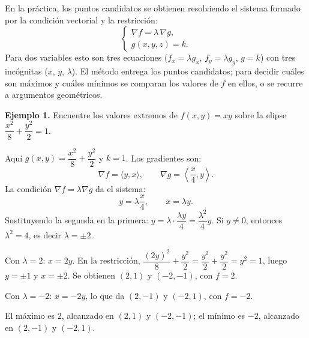 En la práctica, los puntos candidatos se obtienen resolviendo el sistema formado por la condición vectorial y la restricción:
\[
\begin{cases}
\nabla f = \lambda\, \nabla g, \\[2pt]
g(x, y, z) = k.
\end{cases}
\]
Para dos variables esto son tres ecuaciones ($f_x = \lambda g_x$, $f_y = \lambda g_y$, $g = k$) con tres incógnitas ($x$, $y$, $\lambda$). El método entrega los puntos candidatos; para decidir cuáles son máximos y cuáles mínimos se comparan los valores de $f$ en ellos, o se recurre a argumentos geométricos.

\textbf{Ejemplo 1.} Encuentre los valores extremos de $f(x, y) = xy$ sobre la elipse $\dfrac{x^2}{8} + \dfrac{y^2}{2} = 1$.

Aquí $g(x, y) = \dfrac{x^2}{8} + \dfrac{y^2}{2}$ y $k = 1$. Los gradientes son:
\[
\nabla f = \langle y, x \rangle, \qquad \nabla g = \left\langle \frac{x}{4}, y \right\rangle.
\]
La condición $\nabla f = \lambda \nabla g$ da el sistema:
\[
y = \lambda \frac{x}{4}, \qquad x = \lambda y.
\]
Sustituyendo la segunda en la primera: $y = \lambda \cdot \dfrac{\lambda y}{4} = \dfrac{\lambda^2}{4} y$. Si $y \neq 0$, entonces $\lambda^2 = 4$, es decir $\lambda = \pm 2$.

Con $\lambda = 2$: $x = 2y$. En la restricción, $\dfrac{(2y)^2}{8} + \dfrac{y^2}{2} = \dfrac{y^2}{2} + \dfrac{y^2}{2} = y^2 = 1$, luego $y = \pm 1$ y $x = \pm 2$. Se obtienen $(2, 1)$ y $(-2, -1)$, con $f = 2$.

Con $\lambda = -2$: $x = -2y$, lo que da $(2, -1)$ y $(-2, 1)$, con $f = -2$.

El máximo es $2$, alcanzado en $(2, 1)$ y $(-2, -1)$; el mínimo es $-2$, alcanzado en $(2, -1)$ y $(-2, 1)$.

